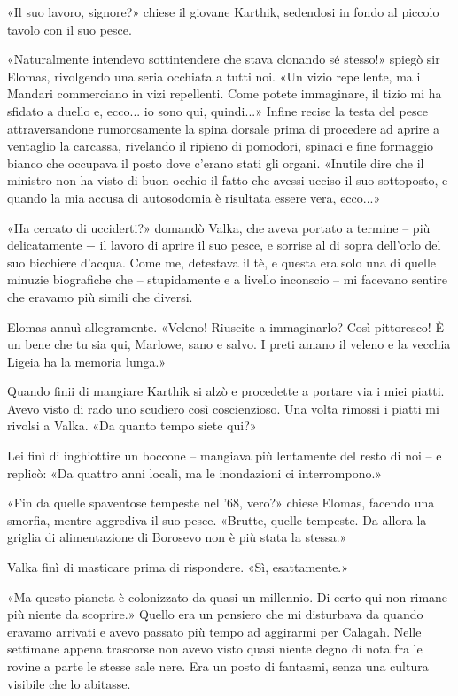 «Il suo lavoro, signore?» chiese il giovane Karthik, sedendosi in fondo
al piccolo tavolo con il suo pesce.

«Naturalmente intendevo sottintendere che stava clonando sé stesso!»
spiegò sir Elomas, rivolgendo una seria occhiata a tutti noi. «Un vizio
repellente, ma i Mandari commerciano in vizi repellenti. Come potete
immaginare, il tizio mi ha sfidato a duello e, ecco... io sono qui,
quindi...» Infine recise la testa del pesce attraversandone
rumorosamente la spina dorsale prima di procedere ad aprire a ventaglio
la carcassa, rivelando il ripieno di pomodori, spinaci e fine formaggio
bianco che occupava il posto dove c'erano stati gli organi. «Inutile
dire che il ministro non ha visto di buon occhio il fatto che avessi
ucciso il suo sottoposto, e quando la mia accusa di autosodomia è
risultata essere vera, ecco...»

«Ha cercato di ucciderti?» domandò Valka, che aveva portato a termine --
più delicatamente − il lavoro di aprire il suo pesce, e sorrise al di
sopra dell'orlo del suo bicchiere d'acqua. Come me, detestava il tè, e
questa era solo una di quelle minuzie biografiche che -- stupidamente e
a livello inconscio -- mi facevano sentire che eravamo più simili che
diversi.

Elomas annuì allegramente. «Veleno! Riuscite a immaginarlo? Così
pittoresco! È un bene che tu sia qui, Marlowe, sano e salvo. I preti
amano il veleno e la vecchia Ligeia ha la memoria lunga.»

Quando finii di mangiare Karthik si alzò e procedette a portare via i
miei piatti. Avevo visto di rado uno scudiero così coscienzioso. Una
volta rimossi i piatti mi rivolsi a Valka. «Da quanto tempo siete qui?»

Lei finì di inghiottire un boccone -- mangiava più lentamente del resto
di noi -- e replicò: «Da quattro anni locali, ma le inondazioni ci
interrompono.»

«Fin da quelle spaventose tempeste nel '68, vero?» chiese Elomas,
facendo una smorfia, mentre aggrediva il suo pesce. «Brutte, quelle
tempeste. Da allora la griglia di alimentazione di Borosevo non è più
stata la stessa.»

Valka finì di masticare prima di rispondere. «Sì, esattamente.»

«Ma questo pianeta è colonizzato da quasi un millennio. Di certo qui non
rimane più niente da scoprire.» Quello era un pensiero che mi disturbava
da quando eravamo arrivati e avevo passato più tempo ad aggirarmi per
Calagah. Nelle settimane appena trascorse non avevo visto quasi niente
degno di nota fra le rovine a parte le stesse sale nere. Era un posto di
fantasmi, senza una cultura visibile che lo abitasse.

